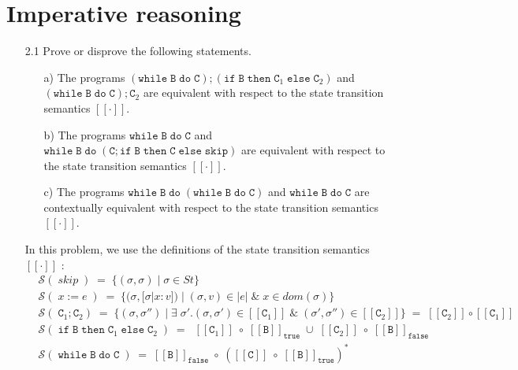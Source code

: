 \documentclass{article}
\newcommand{\B}{\mathtt{B}}
\newcommand{\C}{\mathtt{C}}
\newcommand{\true}{\mathtt{true}}
\newcommand{\false}{\mathtt{false}}
\newcommand{\ifsym}{\mathtt{if}}
\newcommand{\then}{\mathtt{then}}
\newcommand{\elsesym}{\mathtt{else}}
\newcommand{\whilesym}{\mathtt{while}}
\newcommand{\dosym}{\mathtt{do}}
\newcommand{\skipsym}{\mathtt{skip}}
\newcommand{\question}[1]
{\color{DarkBlue}#1 \color{Black}}
\begin{document}
\section{Imperative reasoning}
\begin{enumerate}

\question{
\item[2.1] Prove or disprove the following statements.
\begin{enumerate}
\item[a)] The programs $(\whilesym\; \B \; \dosym \; \C); (\ifsym \; \B \; \then \; \C_1 \; \elsesym \; \C_2)$ and $(\whilesym \; \B \; \dosym \; \C);\C_2$
are equivalent with respect to the state transition semantics $[[\cdot]]$.

\item[b)] The programs $\whilesym\; \B \; \dosym \; \C$ and $\whilesym \; \B \; \dosym \; (\C;\ifsym \; \B \; \then \; \C \; \elsesym \; \skipsym)$ are 
equivalent with respect to the state transition semantics $[[\cdot]]$.

\item[c)] The programs $\whilesym\; \B \; \dosym \; (\whilesym \; \B \; \dosym \; \C)$ and $\whilesym\; \B \; \dosym \; \C$ are 
contextually equivalent with respect to the state transition semantics $[[\cdot]]$.
\end{enumerate}
}

In this problem, we use the definitions of the state transition semantics
$[[\cdot]]$ :
\begin{align*}
& \mathcal{S}( \; skip \; ) \; = \; \{ (\sigma, \sigma) \; | \; \sigma \in St \}
\\
& \mathcal{S}( \; x := e \; ) \; = \; \{ (\sigma, [\sigma | x : v]) \; | \;
(\sigma, v) \in | e | \; \& \; x \in dom(\sigma) \} \\
& \mathcal{S}( \; \C_1 ; \C_2 ) \;  = \; \{ (\sigma, \sigma'') \; | \; \exists
\; \sigma'.(\sigma, \sigma') \in [[\C_1]] \; \&  \; (\sigma',\sigma'') \in [[\C_2]]
\} \; = \; [[\C_2]] \circ [[\C_1]] \\
& \mathcal{S}( \; \ifsym \; \B \; \then  \; \C_1 \; \elsesym \; \C_2 \; ) \; =
\; \; [[\C_1]] \; \circ  \; [[\B]]_{\true} \; \cup \; [[\C_2]] \; \circ \;
[[\B]]_{\false} \\
& \mathcal{S}( \; \whilesym \; \B \; \dosym \; \C \; ) \; = \; [[\B]]_{\false}
\; \circ \; ([[\C]] \; \circ \; [[\B]]_{\true} )^{*} \\
\end{align*}

\begin{enumerate}


\end{enumerate}
\end{enumerate}
\end{document}
